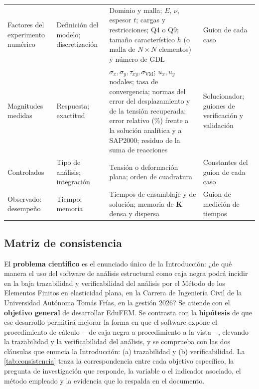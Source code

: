 {\begin{longtable}{@{}>{\raggedright\arraybackslash}p{2.9cm}>{\raggedright\arraybackslash}p{2.5cm}>{\raggedright\arraybackslash}p{5.5cm}>{\raggedright\arraybackslash}p{2.7cm}@{}}
\midrule
Factores del experimento numérico & Definición del modelo; discretización & Dominio y malla; $E$, $\nu$, espesor $t$; cargas y restricciones; Q4 o Q9; tamaño característico $h$ (o malla de $N\times N$ elementos) y número de GDL & Guion de cada caso \\
Magnitudes medidas & Respuesta; exactitud & $\sigma_x,\sigma_y,\tau_{xy},\sigma_{\mathrm{VM}}$; $u_x,u_y$ nodales; tasa de convergencia; normas del error del desplazamiento y de la tensión recuperada; error relativo (\%) frente a la solución analítica y a SAP2000; residuo de la suma de reacciones & Solucionador; guiones de verificación y validación \\
Controlados & Tipo de análisis; integración & Tensión o deformación plana; orden de cuadratura & Constantes del guion de cada caso \\
Observado: desempeño & Tiempo; memoria & Tiempos de ensamblaje y de solución; memoria de $\bm{K}$ densa y dispersa & Guion de medición de tiempos \\
\end{longtable}}

\subsection{Matriz de consistencia}
\label{sec:matriz-consistencia}

El \textbf{problema científico} es el enunciado único de la Introducción: ¿de qué manera el uso del software de análisis estructural como caja negra podrá incidir en la baja trazabilidad y verificabilidad del análisis por el Método de los Elementos Finitos en elasticidad plana, en la Carrera de Ingeniería Civil de la Universidad Autónoma Tomás Frías, en la gestión 2026? Se atiende con el \textbf{objetivo general} de desarrollar EduFEM. Se contrasta con la \textbf{hipótesis} de que ese desarrollo permitirá mejorar la forma en que el software expone el procedimiento de cálculo ---de caja negra a procedimiento a la vista---, elevando la trazabilidad y la verificabilidad del análisis, y se comprueba con las dos cláusulas que enuncia la Introducción: (a) trazabilidad y (b) verificabilidad. La \autoref{tab:consistencia} traza la correspondencia entre cada objetivo específico, la pregunta de investigación que responde, la variable o el indicador asociado, el método empleado y la evidencia que lo respalda en el documento.

